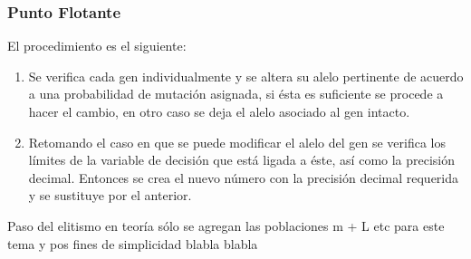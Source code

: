 \documentclass[class=report, crop=false]{standalone}
\begin{document}
\subsubsection{Punto Flotante}
El procedimiento es el siguiente:

\begin{enumerate}
\item Se verifica cada gen individualmente y se altera su 
alelo pertinente de acuerdo a una probabilidad de mutación 
asignada, si ésta es suficiente se procede a hacer el cambio, 
en otro caso se deja el alelo asociado al gen intacto.
\item Retomando el caso en que se puede modificar el alelo 
del gen se verifica los límites de la variable de decisión 
que está ligada a éste, así como la precisión decimal. 
Entonces se crea el nuevo número con la precisión decimal 
requerida y se sustituye por el anterior.
\end{enumerate}


Paso del elitismo en teoría sólo se agregan las poblaciones m + L etc para este tema y pos fines de simplicidad
blabla blabla

\end{document}
